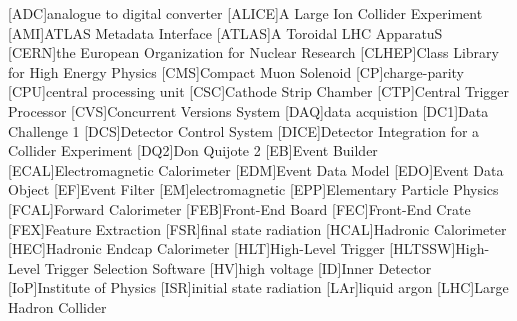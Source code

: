 \begin{acronym}[HLTSSW]
[ADC]{analogue to digital converter\protect{}}
[ALICE]{A Large Ion Collider Experiment\protect{}}
[AMI]{ATLAS Metadata Interface\protect{}}
[ATLAS]{A Toroidal LHC ApparatuS\protect{}}
[CERN]{the European Organization for Nuclear Research\protect{}}
[CLHEP]{Class Library for High Energy Physics\protect{}}
[CMS]{Compact Muon Solenoid\protect{}}
[CP]{charge-parity\protect{}}
[CPU]{central processing unit\protect{}}
[CSC]{Cathode Strip Chamber\protect{}}
[CTP]{Central Trigger Processor\protect{}}
[CVS]{Concurrent Versions System\protect{}}
[DAQ]{data acquistion\protect{}}
[DC1]{Data Challenge 1\protect{}}
[DCS]{Detector Control System\protect{}}
[DICE]{Detector Integration for a Collider Experiment\protect{}}
[DQ2]{Don Quijote 2\protect{}}
[EB]{Event Builder\protect{}}
[ECAL]{Electromagnetic Calorimeter\protect{}}
[EDM]{Event Data Model\protect{}}
[EDO]{Event Data Object\protect{}}
[EF]{Event Filter\protect{}}
[EM]{electromagnetic\protect{}}
[EPP]{Elementary Particle Physics\protect{}}
[FCAL]{Forward Calorimeter\protect{}}
[FEB]{Front-End Board\protect{}}
[FEC]{Front-End Crate\protect{}}
[FEX]{Feature Extraction\protect{}}
[FSR]{final state radiation\protect{}}
[HCAL]{Hadronic Calorimeter\protect{}}
[HEC]{Hadronic Endcap Calorimeter\protect{}}
[HLT]{High-Level Trigger\protect{}}
[HLTSSW]{High-Level Trigger Selection Software\protect{}}
[HV]{high voltage\protect{}}
[ID]{Inner Detector\protect{}}
[IoP]{Institute of Physics\protect{}}
[ISR]{initial state radiation\protect{}}
[LAr]{liquid argon\protect{}}
[LHC]{Large Hadron Collider\protect{}}

\end{acronym}

